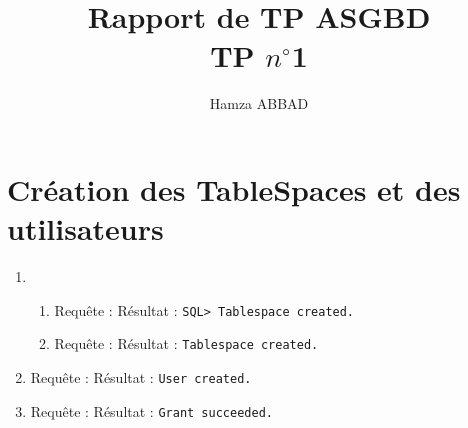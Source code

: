 \documentclass[12pt,a4paper]{article}
\author{Hamza ABBAD}
\title{\textbf{Rapport de TP ASGBD} \\ TP $n^{\circ}$1}
\begin{document}
\maketitle
\section{Création des TableSpaces et des utilisateurs}
	\begin{enumerate}
		\item
		\begin{enumerate}
			\item Requête : 
				Résultat : \texttt{SQL> Tablespace created.}
			\item Requête : 
			Résultat : \texttt{Tablespace created.}
		\end{enumerate}
		\item Requête : 
			Résultat : \texttt{User created.}
		\item Requête : 
			Résultat : \texttt{Grant succeeded.}
	\end{enumerate}
\end{document}
